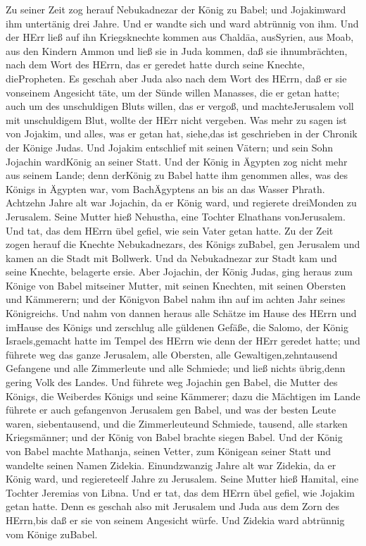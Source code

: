  Zu seiner Zeit zog herauf Nebukadnezar der König zu Babel;
und Jojakimward ihm untertänig drei Jahre. Und er wandte sich und ward
abtrünnig von ihm.  Und der HErr ließ auf ihn Kriegsknechte
kommen aus Chaldäa, ausSyrien, aus Moab, aus den Kindern Ammon und ließ
sie in Juda kommen, daß sie ihnumbrächten, nach dem Wort des HErrn, das
er geredet hatte durch seine Knechte, diePropheten.  Es
geschah aber Juda also nach dem Wort des HErrn, daß er sie vonseinem
Angesicht täte, um der Sünde willen Manasses, die er getan hatte;
 auch um des unschuldigen Bluts willen, das er vergoß, und
machteJerusalem voll mit unschuldigem Blut, wollte der HErr nicht
vergeben.  Was mehr zu sagen ist von Jojakim, und alles, was
er getan hat, siehe,das ist geschrieben in der Chronik der Könige Judas.
 Und Jojakim entschlief mit seinen Vätern; und sein Sohn
Jojachin wardKönig an seiner Statt.  Und der König in
Ägypten zog nicht mehr aus seinem Lande; denn derKönig zu Babel hatte
ihm genommen alles, was des Königs in Ägypten war, vom BachÄgyptens an
bis an das Wasser Phrath.  Achtzehn Jahre alt war Jojachin,
da er König ward, und regierete dreiMonden zu Jerusalem. Seine Mutter
hieß Nehustha, eine Tochter Elnathans vonJerusalem.  Und
tat, das dem HErrn übel gefiel, wie sein Vater getan hatte.
 Zu der Zeit zogen herauf die Knechte Nebukadnezars, des
Königs zuBabel, gen Jerusalem und kamen an die Stadt mit Bollwerk.
 Und da Nebukadnezar zur Stadt kam und seine Knechte,
belagerte ersie.  Aber Jojachin, der König Judas, ging
heraus zum Könige von Babel mitseiner Mutter, mit seinen Knechten, mit
seinen Obersten und Kämmerern; und der Königvon Babel nahm ihn auf im
achten Jahr seines Königreichs.  Und nahm von dannen heraus
alle Schätze im Hause des HErrn und imHause des Königs und zerschlug
alle güldenen Gefäße, die Salomo, der König Israels,gemacht hatte im
Tempel des HErrn wie denn der HErr geredet hatte;  und
führete weg das ganze Jerusalem, alle Obersten, alle
Gewaltigen,zehntausend Gefangene und alle Zimmerleute und alle Schmiede;
und ließ nichts übrig,denn gering Volk des Landes.  Und
führete weg Jojachin gen Babel, die Mutter des Königs, die Weiberdes
Königs und seine Kämmerer; dazu die Mächtigen im Lande führete er auch
gefangenvon Jerusalem gen Babel,  und was der besten Leute
waren, siebentausend, und die Zimmerleuteund Schmiede, tausend, alle
starken Kriegsmänner; und der König von Babel brachte siegen Babel.
 Und der König von Babel machte Mathanja, seinen Vetter,
zum Königean seiner Statt und wandelte seinen Namen Zidekia.
 Einundzwanzig Jahre alt war Zidekia, da er König ward, und
regiereteelf Jahre zu Jerusalem. Seine Mutter hieß Hamital, eine Tochter
Jeremias von Libna.  Und er tat, das dem HErrn übel gefiel,
wie Jojakim getan hatte.  Denn es geschah also mit
Jerusalem und Juda aus dem Zorn des HErrn,bis daß er sie von seinem
Angesicht würfe. Und Zidekia ward abtrünnig vom Könige zuBabel.

